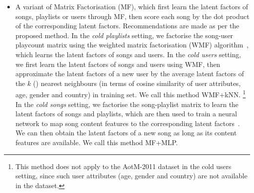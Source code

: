 \begin{itemize}
\item A variant of Matrix Factorisation (MF), which first learn the latent factors of songs, playlists
      or users through MF, then score each song by the dot product of the corresponding latent factors.
      Recommendations are made as per the proposed method.
      In the \emph{cold playlists} setting, we factorise the song-user playcount matrix using the 
      weighted matrix factorisation (WMF) algorithm~\cite{hu2008collaborative}, which learns the 
      latent factors of songs and users.
      In the \emph{cold users} setting, we first learn the latent factors of songs and users using WMF,
      then approximate the latent factors of a new user by the average latent factors of the $k$ ()
      nearest neighbours %
      (in terms of cosine similarity of user attributes, \eg age, gender and country) in training set.
      We call this method WMF+kNN.
      \footnote{This method does not apply to the AotM-2011 dataset in the cold users setting,
      since such user attributes (\eg age, gender and country) are not available in the dataset.}
      In the \emph{cold songs} setting, we factorise the song-playlist matrix to learn the latent factors of 
      songs and playlists, which are then used to train a neural network to map song content features 
      to the corresponding latent factors~\cite{Gantner:2010,van2013deep}.
	  We can then obtain the latent factors of a new song as long as its content features are available.
      We call this method MF+MLP. 
%

\end{itemize}
